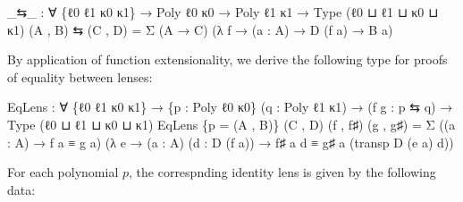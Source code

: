 \documentclass[
  11pt,
  oneside,
  article]{memoir}
\newenvironment{Shaded}{}{}
\newcommand{\NormalTok}[1]{#1}
\newcommand{\OtherTok}[1]{\textcolor[rgb]{0.00,0.44,0.13}{#1}}
\theoremstyle{definition}
\theoremstyle{plain}
\newcommand{\0}{\textsf{0}}
\newcommand{\1}{\tn{\textsf{1}}}
\begin{document}
\begin{Shaded}
\begin{Highlighting}[]
\OtherTok{\_}\NormalTok{⇆}\OtherTok{\_} \OtherTok{:} \OtherTok{∀} \OtherTok{\{}\NormalTok{ℓ0 ℓ1 κ0 κ1}\OtherTok{\}} \OtherTok{→}\NormalTok{ Poly ℓ0 κ0 }\OtherTok{→}\NormalTok{ Poly ℓ1 κ1 }\OtherTok{→}\NormalTok{ Type }\OtherTok{(}\NormalTok{ℓ0 ⊔ ℓ1 ⊔ κ0 ⊔ κ1}\OtherTok{)}
\OtherTok{(}\NormalTok{A , B}\OtherTok{)}\NormalTok{ ⇆ }\OtherTok{(}\NormalTok{C , D}\OtherTok{)} \OtherTok{=}\NormalTok{ Σ }\OtherTok{(}\NormalTok{A }\OtherTok{→}\NormalTok{ C}\OtherTok{)} \OtherTok{(λ}\NormalTok{ f }\OtherTok{→} \OtherTok{(}\NormalTok{a }\OtherTok{:}\NormalTok{ A}\OtherTok{)} \OtherTok{→}\NormalTok{ D }\OtherTok{(}\NormalTok{f a}\OtherTok{)} \OtherTok{→}\NormalTok{ B a}\OtherTok{)}
\end{Highlighting}
\end{Shaded}

By application of function extensionality, we derive the following type
for proofs of equality between lenses:

\begin{Shaded}
\begin{Highlighting}[]
\NormalTok{EqLens }\OtherTok{:} \OtherTok{∀} \OtherTok{\{}\NormalTok{ℓ0 ℓ1 κ0 κ1}\OtherTok{\}}
         \OtherTok{→} \OtherTok{\{}\NormalTok{p }\OtherTok{:}\NormalTok{ Poly ℓ0 κ0}\OtherTok{\}} \OtherTok{(}\NormalTok{q }\OtherTok{:}\NormalTok{ Poly ℓ1 κ1}\OtherTok{)}
         \OtherTok{→} \OtherTok{(}\NormalTok{f g }\OtherTok{:}\NormalTok{ p ⇆ q}\OtherTok{)} \OtherTok{→}\NormalTok{ Type }\OtherTok{(}\NormalTok{ℓ0 ⊔ ℓ1 ⊔ κ0 ⊔ κ1}\OtherTok{)}
\NormalTok{EqLens }\OtherTok{\{}\NormalTok{p }\OtherTok{=} \OtherTok{(}\NormalTok{A , B}\OtherTok{)\}} \OtherTok{(}\NormalTok{C , D}\OtherTok{)} \OtherTok{(}\NormalTok{f , f♯}\OtherTok{)} \OtherTok{(}\NormalTok{g , g♯}\OtherTok{)} \OtherTok{=}
\NormalTok{  Σ }\OtherTok{((}\NormalTok{a }\OtherTok{:}\NormalTok{ A}\OtherTok{)} \OtherTok{→}\NormalTok{ f a ≡ g a}\OtherTok{)}
    \OtherTok{(λ}\NormalTok{ e }\OtherTok{→} \OtherTok{(}\NormalTok{a }\OtherTok{:}\NormalTok{ A}\OtherTok{)} \OtherTok{(}\NormalTok{d }\OtherTok{:}\NormalTok{ D }\OtherTok{(}\NormalTok{f a}\OtherTok{))} 
           \OtherTok{→}\NormalTok{ f♯ a d ≡ g♯ a }\OtherTok{(}\NormalTok{transp D }\OtherTok{(}\NormalTok{e a}\OtherTok{)}\NormalTok{ d}\OtherTok{))}
\end{Highlighting}
\end{Shaded}

For each polynomial \(p\), the correspnding identity lens is given by
the following data:
\end{document}
